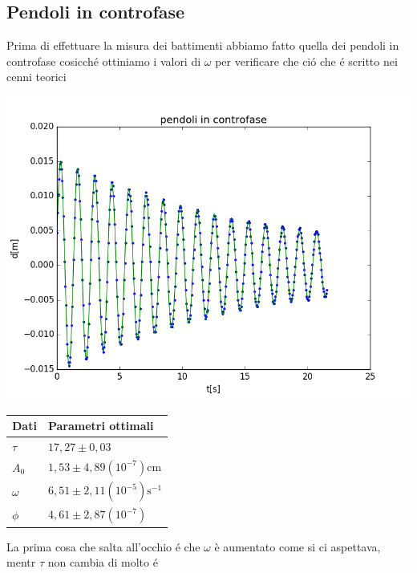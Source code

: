 \documentclass{exam}
\begin{document}
		\subsection{Pendoli in controfase}
			Prima di effettuare la misura dei battimenti abbiamo fatto quella dei pendoli in controfase cosicch\'e ottiniamo i valori di $\omega$ per verificare che ci\'o che \'e scritto nei cenni teorici\\
			\begin{minipage}{0.5\textwidth}
				\includegraphics[width=\textwidth]{controfase}
				\end{minipage}
			\begin{minipage}{0.5\textwidth}
				\begin{tabular}{ll}
					\toprule
					Dati & Parametri ottimali \\
					\midrule
					$\tau$ & $17,27 \pm 0,03$ \\
					$A_{0}$ & $1,53 \pm 4,89(10^{-7})$cm\\
					$\omega$ & $6,51 \pm 2,11(10^{-5})\textrm{s}^{-1}$\\			
					$\phi$ & $4,61 \pm 2,87(10^{-7})$\\
					\bottomrule
				\end{tabular}
			\end{minipage}
			La prima cosa che salta all'occhio \'e che $\omega$ è aumentato come si ci aspettava, mentr $\tau$ non cambia di molto \'e
\end{document}
